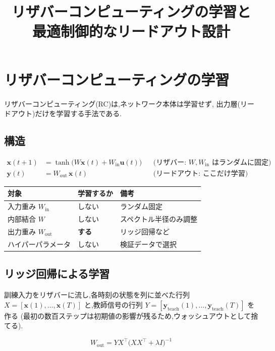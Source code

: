 \documentclass[a4paper,11pt]{ltjsarticle}
\title{リザバーコンピューティングの学習と\\最適制御的なリードアウト設計}
\date{}
\newcommand{\Win}{W_{\mathrm{in}}}
\newcommand{\Wout}{W_{\mathrm{out}}}
\newcommand{\yt}{\bm{y}_{\mathrm{teach}}}
\newcommand{\T}{^{\top}}
\begin{document}
\maketitle

\section{リザバーコンピューティングの学習}

リザバーコンピューティング(RC)は,ネットワーク本体は学習せず,
出力層(リードアウト)だけを学習する手法である.

\subsection{構造}

\begin{align}
  \bm{x}(t+1) &= \tanh\!\bigl(W\bm{x}(t) + \Win\bm{u}(t)\bigr)
  && \text{(リザバー: $W,\Win$ はランダムに固定)} \\
  \bm{y}(t) &= \Wout\,\bm{x}(t)
  && \text{(リードアウト: ここだけ学習)}
\end{align}

\begin{center}
\begin{tabular}{lll}
\toprule
対象 & 学習するか & 備考 \\
\midrule
入力重み $\Win$ & しない & ランダム固定 \\
内部結合 $W$ & しない & スペクトル半径のみ調整 \\
出力重み $\Wout$ & \textbf{する} & リッジ回帰など \\
ハイパーパラメータ & しない & 検証データで選択 \\
\bottomrule
\end{tabular}
\end{center}

\subsection{リッジ回帰による学習}

訓練入力をリザバーに流し,各時刻の状態を列に並べた行列
$X = [\bm{x}(1),\dots,\bm{x}(T)]$ と,教師信号の行列
$Y = [\yt(1),\dots,\yt(T)]$ を作る
(最初の数百ステップは初期値の影響が残るため,ウォッシュアウトとして捨てる).

\begin{keybox}[title=リッジ回帰の解]
\begin{equation}
  \Wout = Y X\T \bigl(X X\T + \lambda I\bigr)^{-1}
  \label{eq:ridge}
\end{equation}
\end{keybox}
\end{document}
